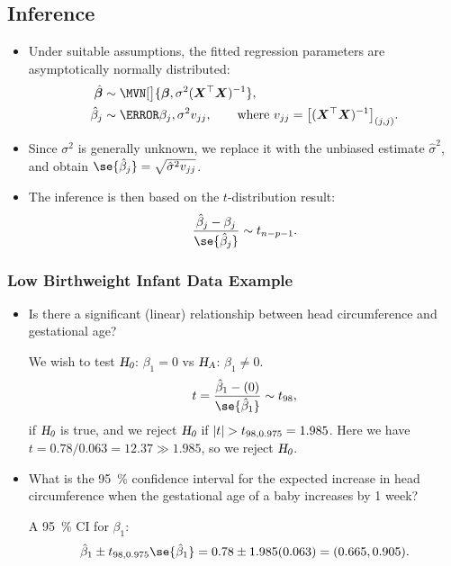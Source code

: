 \documentclass{article}\usepackage[]{graphicx}\usepackage[svgnames]{xcolor}
\newcommand*\circled[1]{\tikz[baseline=(char.base)]{\node[shape=circle,draw,inner sep=2pt] (char) {#1};}}
\newcommand{\HN}{\textsl{H}_{\textsl{0}}}%
\newcommand{\HA}{\textsl{H}_{\textsl{A}}}%
\DeclarePairedDelimiter\abs{\lvert}{\rvert}
\providecommand{\Vector}[1]{\bm{#1}}%
\providecommand{\Matrix}[1]{\bm{#1}}
\begin{document}
\subsection*{\circled{4} Inference}
\begin{itemize}
      \item Under suitable assumptions, the fitted regression parameters are asymptotically
            normally distributed:
            \begin{align*}
                  \hat{\Vector{\beta}} & \sim \MVN[\big]{\Vector{\beta},\sigma^2(\Matrix{X}^\top \Matrix{X})^{-1}},                                        \\
                  \hat{\beta}_j        & \sim \N{\beta_j,\sigma^2v_{jj}},\qquad\text{where $v_{jj}=\bigl[(\Matrix{X}^\top\Matrix{X})^{-1}\bigr]_{(j,j)}$}.
            \end{align*}
      \item Since $ \sigma^2 $ is generally unknown, we replace it with the unbiased estimate $ \hat{\sigma}^2 $, and obtain $ \se{\hat{\beta}_j}=\sqrt{\hat{\sigma}^2v_{jj}} $.
      \item The inference is then based on the $t$-distribution result:
            \[ \frac{\hat{\beta}_j-\beta_j}{\se{\hat{\beta}_j}}\sim t_{n-p-1}.  \]
\end{itemize}
\subsubsection*{Low Birthweight Infant Data Example}
\begin{itemize}
      \item Is there a significant (linear) relationship between head circumference and
            gestational age?

            We wish to test $ \HN $: $ \beta_1=0 $ vs $ \HA $: $ \beta_1\ne 0 $.
            \[ t=\frac{\hat{\beta}_1-(0)}{\se{\hat{\beta}_1}}\sim t_{98}, \]
            if $ \HN $ is true, and we reject $ \HN $ if $ \abs{t}>t_{98,0.975}=1.985 $.
            Here we have $ t=0.78/0.063=12.37\gg 1.985 $, so we reject $ \HN $.
      \item What is the \qty{95}{\percent} confidence interval for the expected increase in head
            circumference when the gestational age of a baby increases by 1 week?

            A \qty{95}{\percent} CI for $ \beta_1 $:
            \[ \hat{\beta}_1\pm t_{98,0.975}\se{\hat{\beta}_1}=0.78\pm 1.985(0.063)=(0.665,0.905). \]
\end{itemize}
\end{document}
